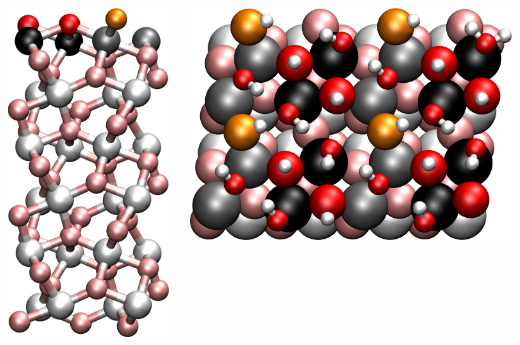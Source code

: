 \documentclass[hyperref={pdfpagelabels=false}]{beamer}
\begin{document}
\begin{frame}
\begin{columns}
\begin{center}
 \includegraphics[width=.9\textwidth]{figures/30layer-model.png}~
 \end{center}
 \begin{center}
 \includegraphics[width=.9\textwidth]{figures/O-I-fully.png}

\end{center}
\end{columns}
\end{frame}
\end{document}
